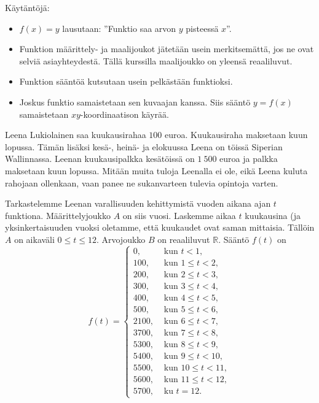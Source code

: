
Käytäntöjä:
\begin{itemize}
\item $f(x) = y$ lausutaan: ''Funktio saa arvon $y$ pisteessä $x$''.
\item Funktion määrittely- ja maalijoukot jätetään usein merkitsemättä, jos ne ovat selviä asiayhteydestä. Tällä kurssilla maalijoukko on yleensä reaaliluvut.
\item Funktion sääntöä kutsutaan usein pelkästään funktioksi.
\item Joskus funktio samaistetaan sen kuvaajan kanssa.  Siis sääntö $y=f(x)$ samaistetaan $xy$-koordinaatison käyrää.
\end{itemize}

\begin{esimerkki}
Leena Lukiolainen saa kuukausirahaa $100$ euroa.  Kuukausiraha maksetaan kuun lopussa. Tämän lisäksi kesä-, heinä- ja elokuussa Leena on töissä Siperian Wallinnassa.  Leenan kuukausipalkka kesätöissä on $1\ 500$ euroa ja palkka maksetaan kuun lopussa.  Mitään muita tuloja Leenalla ei ole, eikä Leena kuluta rahojaan ollenkaan, vaan panee ne sukanvarteen tulevia opintoja varten. 

Tarkastelemme Leenan varallisuuden kehittymistä vuoden aikana ajan $t$ funktiona. Määrittelyjoukko $A$ on siis vuosi. Laskemme aikaa $t$ kuukausina (ja yksinkertaisuuden vuoksi oletamme, että kuukaudet ovat saman mittaisia. Tällöin $A$ on aikaväli $0\le t\le 12$. Arvojoukko $B$ on reaaliluvut $\mathbb{R}$.  Sääntö $f(t)$ on
$$
f(t) = \left\{\begin{array}{rl}
0, & \text{ kun } t<1, \\
100, & \text{ kun } 1\le t < 2, \\
200, & \text{ kun } 2\le t < 3, \\
300, & \text{ kun } 3\le t < 4, \\
400, & \text{ kun } 4\le t < 5, \\
500, & \text{ kun } 5\le t < 6, \\
2100, & \text{ kun } 6\le t < 7, \\
3700, & \text{ kun } 7\le t < 8, \\
5300, & \text{ kun } 8\le t < 9, \\
5400, & \text{ kun } 9\le t < 10, \\
5500, & \text{ kun } 10\le t < 11, \\
5600, & \text{ kun } 11\le t < 12, \\
5700, & \text{ ku } t=12.
\end{array}\right.
$$
\end{esimerkki}

